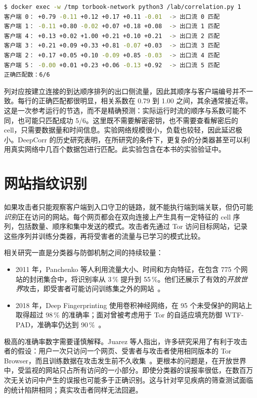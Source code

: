 \begin{lstlisting}[language=bash,numbers=none]
$ docker exec -w /tmp torbook-network python3 /lab/correlation.py 1
客户端 0： +0.79 -0.11 +0.12 +0.17 +0.11 -0.01  -> 出口流 0 匹配
客户端 1： -0.11 +0.80 -0.02 +0.07 +0.18 +0.08  -> 出口流 1 匹配
客户端 4： +0.13 +0.02 +1.00 +0.21 +0.10 +0.21  -> 出口流 2 匹配
客户端 3： +0.21 +0.09 +0.33 +0.81 -0.07 +0.03  -> 出口流 3 匹配
客户端 2： +0.17 +0.05 +0.10 -0.09 +0.85 -0.03  -> 出口流 4 匹配
客户端 5： -0.00 +0.01 +0.23 +0.06 -0.13 +0.92  -> 出口流 5 匹配
正确匹配数：6/6
\end{lstlisting}
列对应按建立连接的到达顺序排列的出口侧流量，因此其顺序与客户端编号并不一致。每行的正确匹配都很明显，相关系数在 0.79 到 1.00 之间，其余通常接近零。这是一次参考运行的节选，而不是精确预测：实际运行时流的顺序与系数可能不同，也可能只匹配成功 5/6。这里既不需要解密密钥，也不需要查看解密后的 cell，只需要数据量和时间信息。实验网络规模很小，负载也较轻，因此延迟极小。DeepCorr 的历史研究表明，在所研究的条件下，更复杂的分类器甚至可以利用真实网络中几百个数据包进行匹配。此实验包含在本书的实验验证中。

\section{网站指纹识别}\label{sec:att-wf}

如果攻击者只能观察客户端到入口守卫的链路，就不能执行端到端关联，但仍可能\emph{识别}正在访问的网站。每个网页都会在双向连接上产生具有一定特征的 cell 序列，包括数量、顺序和集中发送的模式。攻击者先通过 Tor 访问目标网站，记录这些序列并训练分类器，再将受害者的流量与已学习的模式比较。

相关研究一直是分类器与防御机制之间的持续较量：
\begin{itemize}
  \item 2011 年，Panchenko 等人利用流量大小、时间和方向特征，在包含 775 个网站的封闭集合中，将识别率从 3\,\% 提升到 55\,\%。他们还展示了有效的\emph{开放世界}攻击，即受害者可能访问训练集之外的网站~\cite{panchenko2011website}。
  \item 2018 年，Deep Fingerprinting 使用卷积神经网络，在 95 个未受保护的网站上取得超过 98\,\% 的准确率；面对曾被考虑用于 Tor 的自适应填充防御 WTF-PAD，准确率仍达到 90\,\%~\cite{sirinam2018deep}。
\end{itemize}

\begin{approfondimento}[忽视基础发生率的谬误]
极高的准确率数字需要谨慎解释。Juarez 等人指出，许多研究采用了有利于攻击者的假设：用户一次只访问一个网页、受害者与攻击者使用相同版本的 Tor Browser，而且训练数据在攻击发生前不久收集~\cite{juarez2014critical}。更根本的问题是，在开放世界中，受监视的网站只占所有访问的一小部分。即使分类器的误报率很低，在数百万次无关访问中产生的误报也可能多于正确识别。这与针对罕见疾病的筛查测试面临的统计陷阱相同；真实攻击者同样无法回避。
\end{approfondimento}

